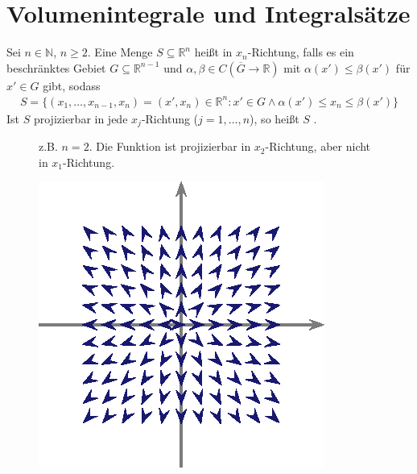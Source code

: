 \documentclass[a4paper,10pt]{scrbook}
\begin{document}
\section{Volumenintegrale und Integralsätze}
\addtocounter{thmn}{1}
\setcounter{theorem}{0}


\begin{theorem}[Definition]
  Sei $n \in \mathbb{N}$, $n \geq 2$. Eine Menge $S \subseteq \mathbb{R}^n$ heißt  in $x_n$-Richtung, falls es ein beschränktes Gebiet $G \subseteq \mathbb{R}^{n-1}$ und $\alpha, \beta \in C(\overline{G} \to \mathbb{R})$ mit $\alpha(x') \leq \beta(x')$ für $x' \in G$ gibt, sodass
  \begin{align*}
    S = \{ (x_1,\ldots,x_{n-1},x_n) = (x',x_n) \in \mathbb{R}^n : x' \in G \land \alpha(x') \leq x_n \leq \beta(x') \}
  \end{align*}
  Ist $S$ projizierbar in jede $x_j$-Richtung ($j = 1,\ldots,n$), so heißt $S$ .
\end{theorem}

\begin{figure}[H]
  z.B. $n=2$. Die Funktion ist projizierbar in $x_2$-Richtung, aber nicht in $x_1$-Richtung.

  \centering
  \includegraphics[scale=0.2]{images/ana3-tmp-59}
\end{figure}
\end{document}

